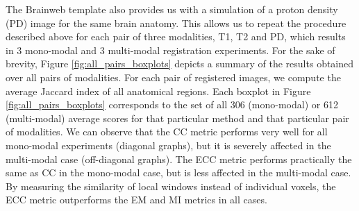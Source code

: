 The Brainweb template also provides us with a simulation of a proton density (PD) image for the same brain anatomy. This allows us to repeat the procedure described above for each pair of three modalities, T1, T2 and PD, which results in 3 mono-modal and 3 multi-modal registration experiments. For the sake of brevity, Figure \ref{fig:all_pairs_boxplots} depicts a summary of the results obtained over all pairs of modalities. For each pair of registered images, we compute the average Jaccard index of all anatomical regions. Each boxplot in Figure \ref{fig:all_pairs_boxplots} corresponds to the set of all 306 (mono-modal) or 612 (multi-modal) average scores for that particular method and that particular pair of modalities. We can observe that the CC metric performs very well for all mono-modal experiments (diagonal graphs), but it is severely affected in the multi-modal case (off-diagonal graphs). The ECC metric performs practically the same as CC in the mono-modal case, but is less affected in the multi-modal case. By measuring the similarity of local windows instead of individual voxels, the ECC metric outperforms the EM and MI metrics in all cases.

